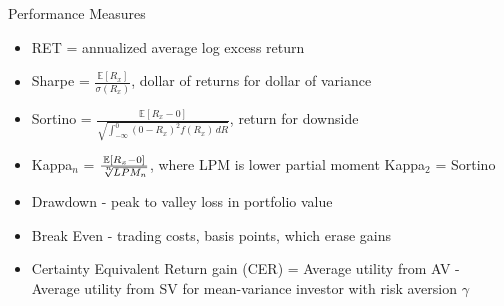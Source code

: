 \documentclass[handout]{beamer}
\begin{document}
\begin{frame}{Performance Measures}
	\begin{itemize}[<+->]
		\item RET = annualized average log excess return
		\item Sharpe = $\frac{\mathbb{E}[R_{x}]}{\sigma(R_{x})}$, dollar of returns for dollar of variance
		\item Sortino = $\frac{\mathbb{E}[R_{x} - 0]}{\sqrt  {\int _{{-\infty }}^{0}(0-R_{x})^{2}f(R_{x})\,dR}}$, return for downside
		\item Kappa$_{n}$ = $\frac{\mathbb{E}[R_{x} - 0]}{\sqrt[\leftroot{-2}\uproot{2}n]{LPM_{n}}}$, where LPM is lower partial moment Kappa$_{2}$ = Sortino
		\item Drawdown - peak to valley loss in portfolio value
		\item Break Even - trading costs, basis points, which erase gains
		\item Certainty Equivalent Return gain (CER) = Average utility from AV - Average utility from SV for mean-variance investor with risk aversion $\gamma$
	\end{itemize}
\end{frame}

%		
\end{document}
